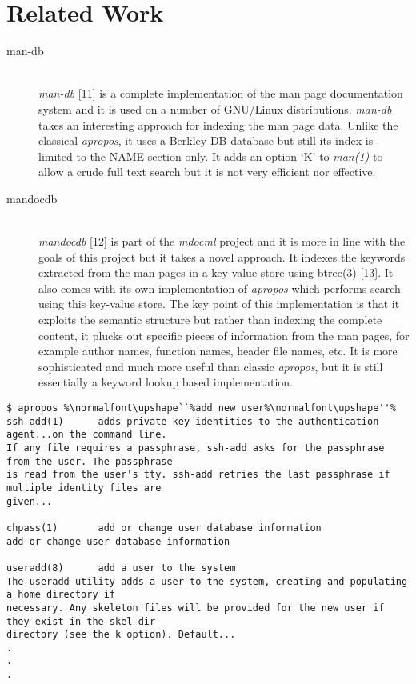 \documentclass[letterpaper,twocolumn,10pt]{article}
\begin{document}
\section{Related Work}
\begin{description}
\item[man-db] \hfill \\
\textit{man-db} [11] is a complete implementation of the man page documentation
system and it is used on a number of GNU/Linux distributions. \textit{man-db}
takes an interesting approach for indexing the man page data. Unlike the
classical \textit{apropos}, it uses a Berkley DB database but still its index
is limited to the NAME section only. It adds an option `K' to \textit{man(1)} to
allow a crude full text search but it is not very efficient nor effective.
\end{description}

\begin{description}
\item[mandocdb] \hfill \\
\textit{mandocdb} [12] is part of the \textit{mdocml} project and it is more in
line with the goals of this project but it
takes a novel approach. It indexes the keywords extracted from the man pages in a
key-value store using btree(3) [13]. It also comes with its own implementation
of \textit{apropos} which performs search using this key-value store. The
key point of this implementation is that it exploits the semantic structure
but rather than indexing the complete content, it plucks out specific pieces of
information from the man pages, for example author names, function names,
header file names, etc. It is more sophisticated and much more useful than
classic
\textit{apropos}, but it is still essentially a keyword lookup based
implementation.
\end{description}

{ \small
{}
\begin{lstlisting}[float=*]
$ apropos %\normalfont\upshape``%add new user%\normalfont\upshape''%
ssh-add(1)      adds private key identities to the authentication agent...on the command line.
If any file requires a passphrase, ssh-add asks for the passphrase from the user. The passphrase
is read from the user's tty. ssh-add retries the last passphrase if multiple identity files are
given...

chpass(1)       add or change user database information
add or change user database information

useradd(8)      add a user to the system
The useradd utility adds a user to the system, creating and populating a home directory if
necessary. Any skeleton files will be provided for the new user if they exist in the skel-dir
directory (see the k option). Default...
.
.
.
\end{lstlisting}
}
\end{document}
